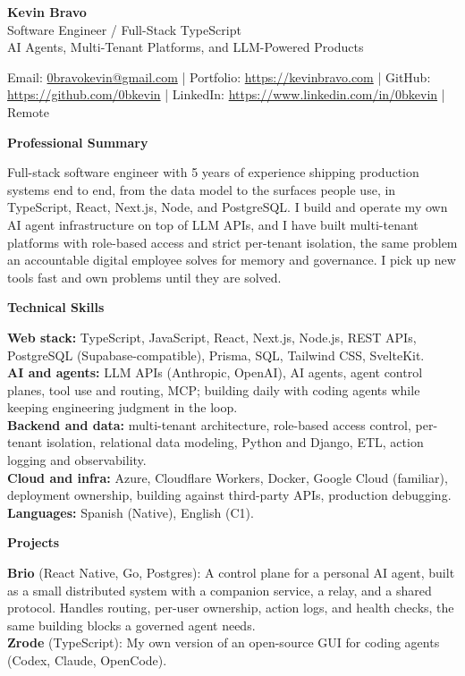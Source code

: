 \documentclass[10pt]{article}
\newcommand{\sectiontitle}[1]{%
    \vspace{5pt}
    \begin{center}
        \textbf{#1}
    \end{center}
    \vspace{-6pt}
}
\begin{document}
\raggedright

\begin{center}
    {\LARGE \textbf{Kevin Bravo}}\\
    Software Engineer / Full-Stack TypeScript \\
    AI Agents, Multi-Tenant Platforms, and LLM-Powered Products \\
    \hrulefill
\end{center}

\begin{center}
    Email: \href{mailto:0bravokevin@gmail.com}{0bravokevin@gmail.com}
    | Portfolio: \href{https://kevinbravo.com}{https://kevinbravo.com}
    | GitHub: \href{https://github.com/0bkevin}{https://github.com/0bkevin}
    | LinkedIn: \href{https://www.linkedin.com/in/0bkevin/}{https://www.linkedin.com/in/0bkevin}
    | Remote
\end{center}

\sectiontitle{Professional Summary}
Full-stack software engineer with 5 years of experience shipping production systems end to end, from the data model to the surfaces people use, in TypeScript, React, Next.js, Node, and PostgreSQL. I build and operate my own AI agent infrastructure on top of LLM APIs, and I have built multi-tenant platforms with role-based access and strict per-tenant isolation, the same problem an accountable digital employee solves for memory and governance. I pick up new tools fast and own problems until they are solved.

\sectiontitle{Technical Skills}
\textbf{Web stack:} TypeScript, JavaScript, React, Next.js, Node.js, REST APIs, PostgreSQL (Supabase-compatible), Prisma, SQL, Tailwind CSS, SvelteKit. \\
\textbf{AI and agents:} LLM APIs (Anthropic, OpenAI), AI agents, agent control planes, tool use and routing, MCP; building daily with coding agents while keeping engineering judgment in the loop. \\
\textbf{Backend and data:} multi-tenant architecture, role-based access control, per-tenant isolation, relational data modeling, Python and Django, ETL, action logging and observability. \\
\textbf{Cloud and infra:} Azure, Cloudflare Workers, Docker, Google Cloud (familiar), deployment ownership, building against third-party APIs, production debugging. \\
\textbf{Languages:} Spanish (Native), English (C1).

\sectiontitle{Projects}
\textbf{Brio} (React Native, Go, Postgres): A control plane for a personal AI agent, built as a small distributed system with a companion service, a relay, and a shared protocol. Handles routing, per-user ownership, action logs, and health checks, the same building blocks a governed agent needs. \\
\textbf{Zrode} (TypeScript): My own version of an open-source GUI for coding agents (Codex, Claude, OpenCode).
\end{document}

